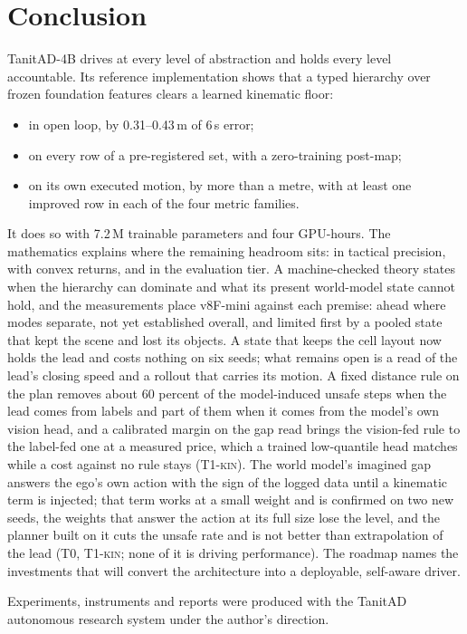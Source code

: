 \documentclass[10pt,twocolumn]{article}
\makeatletter
\theoremstyle{remark}
\newcommand{\tier}[1]{\textsc{\small #1}}
\renewcommand\paragraph{\@startsection{paragraph}{4}{\z@}{1.6ex \@plus .5ex \@minus .2ex}{-1em}{\normalfont\normalsize\bfseries}}
\makeatother
\begin{document}
\section{Conclusion}
TanitAD-4B drives at every level of abstraction and holds every level accountable. Its reference implementation shows that a typed
hierarchy over frozen foundation features clears a learned kinematic floor:
\begin{itemize}
  \item in open loop, by 0.31--0.43\,m of 6\,s error;
  \item on every row of a pre-registered set, with a zero-training post-map;
  \item on its own executed motion, by more than a metre, with at least one improved row in each of the four metric families.
\end{itemize}
It does so with 7.2\,M trainable parameters and four GPU-hours. The mathematics explains where the remaining headroom sits: in
tactical precision, with convex returns, and in the evaluation tier. A machine-checked theory states when the hierarchy can
dominate and what its present world-model state cannot hold, and the measurements place v8F-mini against each premise: ahead
where modes separate, not yet established overall, and limited first by a pooled state that kept the scene and lost its objects.
A state that keeps the cell layout now holds the lead and costs nothing on six seeds; what remains open is a read of the lead's closing speed and a rollout that carries its motion. A fixed distance rule on the plan removes about 60 percent of the model-induced unsafe steps when the lead comes from labels and part of them when it comes from the model's own vision head, and a calibrated margin on the gap read brings the vision-fed rule to the label-fed one at a measured price, which a trained low-quantile head matches while a cost against no rule stays (\tier{T1-kin}). The world model's imagined gap answers the ego's own action with the sign of the logged data until a kinematic term is injected; that term works at a small weight and is confirmed on two new seeds, the weights that answer the action at its full size lose the level, and the planner built on it cuts the unsafe rate and is not better than extrapolation of the lead (\tier{T0}, \tier{T1-kin}; none of it is driving performance). The roadmap names the investments that will convert the
architecture into a deployable, self-aware driver.

\paragraph{Acknowledgements.} Experiments, instruments and reports were produced with the TanitAD autonomous research system under
the author's direction.
\end{document}
